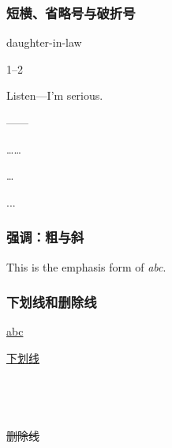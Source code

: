 \documentclass[twoside]{ctexart} %
\begin{document}
        \subsubsection{短横、省略号与破折号}
            daughter-in-law

            1--2
            
            Listen---I'm serious.
        
            ——
            
            ……
            
            \ldots
            
            ...

	    \subsubsection{强调：粗与斜}
            This is the emphasis form of \emph{abc}.
    
	    \subsubsection{下划线和删除线}
            \underline{abc} 
		
            \uline{下划线}\\
            \\
            \\
            \\
            \\
            \sout{删除线}\\
\end{document}
